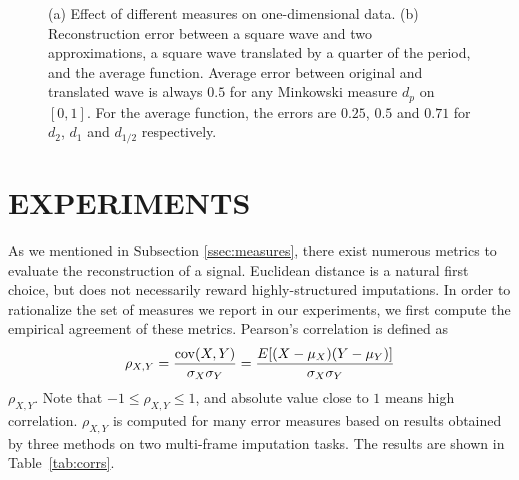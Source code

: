 \documentclass{article}
\begin{document}
\begin{figure}%
\centering
{} 
\hspace{0.1cm}
%
\hspace{8pt}%
\caption{(a) Effect of different measures on one-dimensional data. (b)
  Reconstruction error between a square wave and two approximations, a
  square wave translated by a quarter of the period, and the average
  function. Average error between original and translated wave is
  always $0.5$ for any Minkowski measure $d_p$ on $[0,1]$.  For the
  average function, the errors are $0.25$, $0.5$ and $0.71$ for $d_2$,
  $d_1$ and $d_{1/2}$ respectively.}%
\label{fig:two_measures}
\end{figure}


\section{EXPERIMENTS}
\label{sec:exp}
As we mentioned in Subsection \ref{ssec:measures}, there exist
numerous metrics to evaluate the reconstruction of a signal. Euclidean
distance is a natural first choice, but does not necessarily reward
highly-structured imputations. In order to rationalize the set of
measures we report in our experiments, we first compute the empirical
agreement of these metrics.  Pearson's correlation is defined as
$$
\rho_{X,Y}={\mathrm{cov}(X,Y) \over \sigma_X
    \sigma_Y} ={E[(X-\mu_X)(Y-\mu_Y)] \over \sigma_X\sigma_Y}
$$
$\rho_{X,Y}$. Note that $-1 \leq \rho_{X,Y} \leq 1$, and absolute
value close to $1$ means high correlation. $\rho_{X,Y}$ is computed
for many error measures based on results obtained by three methods on
two multi-frame imputation tasks. The results are shown in
Table~\ref{tab:corrs}.
\end{document}
